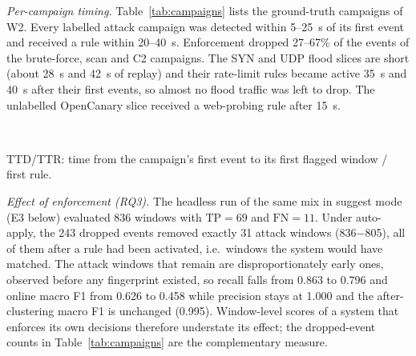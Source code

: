 \documentclass[conference]{IEEEtran}
\begin{document}
\textit{Per-campaign timing.} Table~\ref{tab:campaigns} lists the ground-truth campaigns of W2. Every labelled attack campaign was detected within 5--25~s of its first event and received a rule within 20--40~s. Enforcement dropped 27--67\% of the events of the brute-force, scan and C2 campaigns. The SYN and UDP flood slices are short (about 28~s and 42~s of replay) and their rate-limit rules became active 35~s and 40~s after their first events, so almost no flood traffic was left to drop. The unlabelled OpenCanary slice received a web-probing rule after 15~s.

\begin{table}[t]
\centering
\caption{W2: Ground-truth campaigns in the web application}
\label{tab:campaigns}
\footnotesize
\setlength{\tabcolsep}{2.5pt}
\\[2pt]
\raggedright\scriptsize TTD/TTR: time from the campaign's first event to its first flagged window / first rule.
\end{table}

\textit{Effect of enforcement (RQ3).} The headless run of the same mix in suggest mode (E3 below) evaluated 836 windows with $\mathrm{TP}=69$ and $\mathrm{FN}=11$. Under auto-apply, the 243 dropped events removed exactly 31 attack windows (836$-$805), all of them after a rule had been activated, i.e.\ windows the system would have matched. The attack windows that remain are disproportionately early ones, observed before any fingerprint existed, so recall falls from 0.863 to 0.796 and online macro F1 from 0.626 to 0.458 while precision stays at 1.000 and the after-clustering macro F1 is unchanged (0.995). Window-level scores of a system that enforces its own decisions therefore understate its effect; the dropped-event counts in Table~\ref{tab:campaigns} are the complementary measure.
\end{document}
